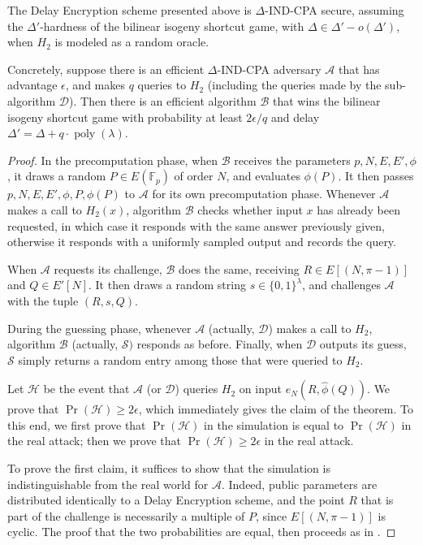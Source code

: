 \documentclass{llncs}
\newcommand{\F}{\mathbb{F}}
\DeclareMathOperator{\poly}{poly}
\begin{document}
\begin{theorem}
  The Delay Encryption scheme presented above is $\Delta$-IND-CPA
  secure, assuming the $\Delta'$-hardness of the bilinear isogeny
  shortcut game, with $\Delta\in\Delta' - o(\Delta')$, when $H_2$ is
  modeled as a random oracle.

  Concretely, suppose there is an efficient $\Delta$-IND-CPA adversary
  $\mathcal{A}$ that has advantage $\epsilon$, and makes $q$ queries
  to $H_2$ (including the queries made by the sub-algorithm
  $\mathcal{D}$). Then there is an efficient algorithm $\mathcal{B}$
  that wins the bilinear isogeny shortcut game with probability at
  least $2\epsilon/q$ and delay $\Delta' = \Delta + q\cdot\poly(\lambda)$.
\end{theorem}
\begin{proof}
  In the precomputation phase, when $\mathcal{B}$ receives the
  parameters $p,N,E,E',\phi$, it draws a random $P\in E(\F_p)$ of
  order $N$, and evaluates $\phi(P)$. %
  It then passes $p,N,E,E',\phi,P,\phi(P)$ to $\mathcal{A}$ for its
  own precomputation phase. %
  Whenever $\mathcal{A}$ makes a call to $H_2(x)$, algorithm
  $\mathcal{B}$ checks whether input $x$ has already been requested,
  in which case it responds with the same answer previously given,
  otherwise it responds with a uniformly sampled output and records
  the query.

  When $\mathcal{A}$ requests its challenge, $\mathcal{B}$ does the
  same, receiving $R\in E[(N,\pi-1)]$ and $Q\in E'[N]$. %
  It then draws a random string $s\in\{0,1\}^\lambda$, and challenges
  $\mathcal{A}$ with the tuple $(R,s,Q)$.

  During the guessing phase, whenever $\mathcal{A}$ (actually,
  $\mathcal{D}$) makes a call to $H_2$, algorithm $\mathcal{B}$
  (actually, $\mathcal{S})$ responds as before. %
  Finally, when $\mathcal{D}$ outputs its guess, $\mathcal{S}$ simply
  returns a random entry among those that were queried to $H_2$.

  Let $\mathcal{H}$ be the event that $\mathcal{A}$ (or $\mathcal{D}$)
  queries $H_2$ on input $e_N(R,\hat\phi(Q))$. %
  We prove that $\Pr(\mathcal{H}) \ge 2\epsilon$, which immediately
  gives the claim of the theorem. %
  To this end, we first prove that $\Pr(\mathcal{H})$ in the
  simulation is equal to $\Pr(\mathcal{H})$ in the real attack; then
  we prove that $\Pr(\mathcal{H})\ge 2\epsilon$ in the real attack.

  To prove the first claim, it suffices to show that the simulation is
  indistinguishable from the real world for $\mathcal{A}$. %
  Indeed, public parameters are distributed identically to a Delay
  Encryption scheme, and the point $R$ that is part of the challenge
  is necessarily a multiple of $P$, since $E[(N,\pi-1)]$ is cyclic. %
  The proof that the two probabilities are equal, then proceeds as in
  \cite[Lemma~4.3, Claim~1]{doi:10.1137/S0097539701398521}.


\end{proof}
\end{document}
